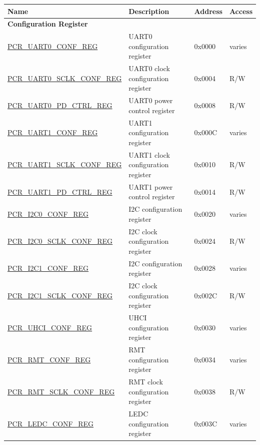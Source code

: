\begin{longtable}{ | p{7.2cm} | p{6cm} | p{1.3cm} | p{1cm} | }
\hline\rowcolor{lightgray}
\textbf{Name} & \textbf{Description} &  \textbf{Address} & \textbf{Access} \\ \hline
\endhead
\multicolumn{4}{|l|}{\textbf{Configuration Register}} \\ \hline
\hyperref[regdesc:PCRUART0CONFREG]{PCR\_UART0\_CONF\_REG} & UART0 configuration register & 0x0000 & varies \\ \hline
\hyperref[regdesc:PCRUART0SCLKCONFREG]{PCR\_UART0\_SCLK\_CONF\_REG} & UART0 clock configuration register & 0x0004 & R/W \\ \hline
\hyperref[regdesc:PCRUART0PDCTRLREG]{PCR\_UART0\_PD\_CTRL\_REG} & UART0 power control register & 0x0008 & R/W \\ \hline
\hyperref[regdesc:PCRUART1CONFREG]{PCR\_UART1\_CONF\_REG} & UART1 configuration register & 0x000C & varies \\ \hline
\hyperref[regdesc:PCRUART1SCLKCONFREG]{PCR\_UART1\_SCLK\_CONF\_REG} & UART1 clock configuration register & 0x0010 & R/W \\ \hline
\hyperref[regdesc:PCRUART1PDCTRLREG]{PCR\_UART1\_PD\_CTRL\_REG} & UART1 power control register & 0x0014 & R/W \\ \hline
\hyperref[regdesc:PCRI2C0CONFREG]{PCR\_I2C0\_CONF\_REG} & I2C configuration register & 0x0020 & varies \\ \hline
\hyperref[regdesc:PCRI2C0SCLKCONFREG]{PCR\_I2C0\_SCLK\_CONF\_REG} & I2C clock configuration register & 0x0024 & R/W \\ \hline
\hyperref[regdesc:PCRI2C1CONFREG]{PCR\_I2C1\_CONF\_REG} & I2C configuration register & 0x0028 & varies \\ \hline
\hyperref[regdesc:PCRI2C1SCLKCONFREG]{PCR\_I2C1\_SCLK\_CONF\_REG} & I2C clock configuration register & 0x002C & R/W \\ \hline
\hyperref[regdesc:PCRUHCICONFREG]{PCR\_UHCI\_CONF\_REG} & UHCI configuration register & 0x0030 & varies \\ \hline
\hyperref[regdesc:PCRRMTCONFREG]{PCR\_RMT\_CONF\_REG} & RMT configuration register & 0x0034 & varies \\ \hline
\hyperref[regdesc:PCRRMTSCLKCONFREG]{PCR\_RMT\_SCLK\_CONF\_REG} & RMT clock configuration register & 0x0038 & R/W \\ \hline
\hyperref[regdesc:PCRLEDCCONFREG]{PCR\_LEDC\_CONF\_REG} & LEDC configuration register & 0x003C & varies \\ \hline

\end{longtable}
